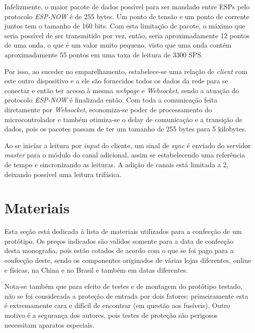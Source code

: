 Infelizmente, o maior pacote de dados possível para ser mandado entre ESPs pelo protocolo \textit{ESP-NOW} é de 255 bytes. Um ponto de tensão e um ponto de corrente juntos tem o tamanho de 160 bits. Com esta limitação de pacote, o máximo que seria possível de ser transmitido por vez, então, seria aproximadamente 12 pontos de uma onda, o que é um valor muito pequeno, visto que uma onda contém aproximadamente 55 pontos em uma taxa de leitura de 3300 \gls{SPS}.

Por isso, ao suceder no emparelhamento, estabelece-se uma relação de \textit{client} com este outro dispositivo e a ele são fornecidos todos os dados da rede para se conectar e então ter acesso à mesma \textit{webpage} e \textit{Websocket}, sendo a atuação do protocolo \textit{ESP-NOW} é finalizada então. Com toda a comunicação feita diretamente por \textit{Websocket}, economiza-se poder de processamento do microcontrolador e também otimiza-se o delay de comunicação e a transição de dados, pois os pacotes passam de ter um tamanho de 255 bytes para 5 kilobytes.

Ao se iniciar a leitura por \textit{input} do cliente, um sinal de \textit{sync} é enviado do servidor \textit{master} para o módulo do canal adicional, assim se estabelecendo uma referência de tempo e sincronizando as leituras. A adição de canais está limitada a 2, deixando possível uma leitura trifásica.





\section{Materiais}\label{sec:materiais}

Esta seção está dedicada à lista de materiais utilizados para a confecção de um protótipo. Os preços indicados são validos somente para a data de confecção desta monografia, pois estão cotados de acordo com o que se foi pago para a confecção deste, sendo os componentes originados de várias lojas diferentes, online e físicas, na China e no Brasil e também em datas diferentes.

Nota-se também que para efeito de testes e de montagem do protótipo testado, não se foi considerada a proteção de entrada por dois fatores: primeiramente esta é extremamente cara e difícil de encontrar (em questão aos fusíveis). Outro motivo é a segurança dos autores, pois testes de proteção são perigosos necessitam aparatos especiais.

